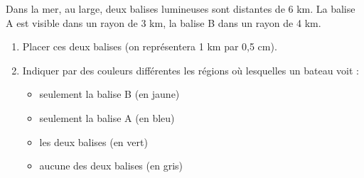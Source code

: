 \documentclass[a4paper]{book}
\begin{document}
    \begin{exercice}
        Dans la mer, au large, deux balises lumineuses sont distantes de 6 km. La balise A est visible dans un rayon de 3 km, la balise B dans un rayon de 4 km.

        \begin{enumerate}
            \item Placer ces deux balises (on représentera 1 km par 0,5 cm).
            \item Indiquer par des couleurs différentes les régions où lesquelles un bateau voit :
            \begin{itemize}
                \item seulement la balise B (en jaune)
                \item seulement la balise A (en bleu)
                \item les deux balises (en vert)
                \item aucune des deux balises (en gris)
            \end{itemize}
        \end{enumerate}
    \end{exercice}
\end{document}
